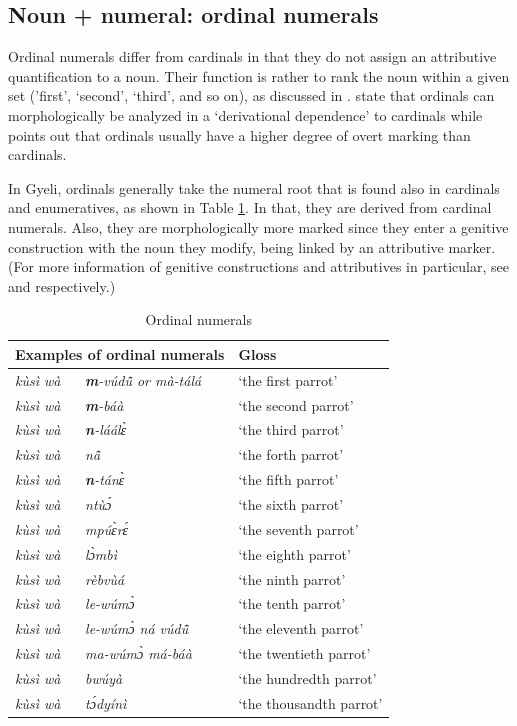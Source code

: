 \subsection{Noun + numeral: ordinal numerals}
\label{sec:Ord}

Ordinal numerals differ from cardinals in that they do not assign an attributive quantification to a noun. Their function is rather to rank the noun within a given set ('first', `second', `third', and so on), as discussed in \citet[111]{borchardt11}. \citet[1]{stolz05} state that ordinals can morphologically be analyzed in a `derivational dependence' to cardinals while \citet[288]{greenberg78} points out that ordinals usually have a higher degree of overt marking than cardinals.

In Gyeli, ordinals generally take the numeral root that is found also in cardinals and enumeratives, as shown in Table \ref{tab:Ordinals}. In that, they are derived from cardinal numerals. Also, they are morphologically more marked since they enter a genitive construction with the noun they modify, being linked by an attributive marker. (For more information of genitive constructions and attributives in particular, see  and  respectively.) 


\begin{table}[!h]
\centering
\begin{tabular}{ll|l}
 \midrule
\multicolumn{2}{c}{Examples of ordinal numerals}  & Gloss \\
  \midrule
{\itshape kùsì wà} & {\itshape {\bfseries m}-vúdũ̂ or mà-tálá} & `the first parrot' \\
{\itshape kùsì wà} & {\itshape {\bfseries m}-báà} & `the second parrot'\\
{\itshape kùsì wà} & {\itshape {\bfseries n}-láálɛ̀} & `the third parrot' \\
{\itshape kùsì wà} & {\itshape nã̂} & `the forth parrot' \\
{\itshape kùsì wà} & {\itshape {\bfseries n}-tánɛ̀} & `the fifth parrot' \\
{\itshape kùsì wà} & {\itshape ntùɔ́} & `the sixth parrot' \\
{\itshape kùsì wà} & {\itshape mpúɛ̀rɛ́} & `the seventh parrot' \\
{\itshape kùsì wà} & {\itshape lɔ̀mbì} & `the eighth parrot' \\
{\itshape kùsì wà} & {\itshape rèbvùá} & `the ninth parrot' \\
{\itshape kùsì wà} & {\itshape le-wúmɔ̀} & `the tenth parrot' \\
{\itshape kùsì wà} & {\itshape le-wúmɔ̀ ná vúdũ̂} & `the eleventh parrot' \\
{\itshape kùsì wà} & {\itshape ma-wúmɔ̀ má-báà} & `the twentieth parrot' \\
{\itshape kùsì wà} & {\itshape bwúyà} & `the hundredth parrot' \\
{\itshape kùsì wà} & {\itshape tɔ́dyínì} & `the thousandth parrot' \\
  \midrule
\end{tabular}
\caption{Ordinal numerals}
\label{tab:Ordinals}
\end{table}

